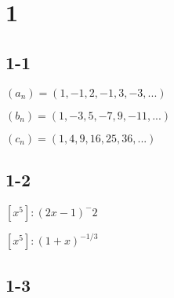 \documentclass[a4paper]{article}
\begin{document}
\section{1}
\subsection{1-1}

$
(a_n) = (1, -1, 2, -1, 3, -3, ...)
$



$
(b_n) = (1, -3, 5, -7, 9, -11, ...)
$



$
(c_n) = (1, 4, 9, 16, 25, 36, ...)
$

\subsection{1-2}
$
[x^5] : (2x - 1)^-2
$

$
[x^5] : (1 + x)^{-1/3}
$


\subsection{1-3}
\end{document}
